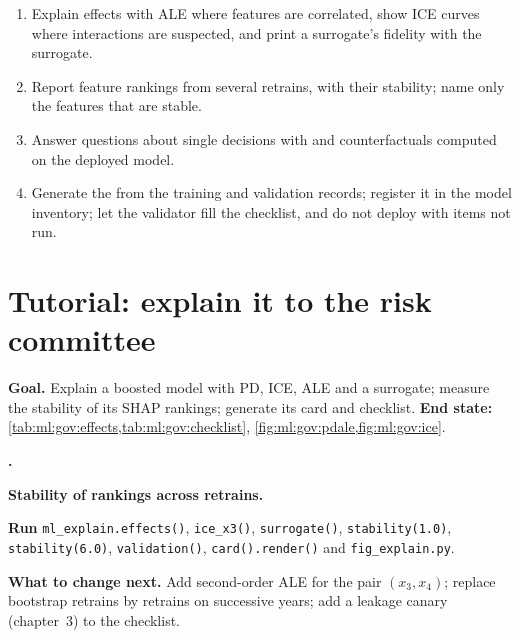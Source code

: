 \begin{method}\label{met:ml:gov:method}
\begin{enumerate}
\item Explain effects with ALE where features are correlated, show ICE curves where interactions are suspected, and print a
surrogate's fidelity with the surrogate.
\item Report feature rankings from several retrains, with their stability; name only the features that are stable.
\item Answer questions about single decisions with  and counterfactuals computed on the deployed model.
\item Generate the  from the training and validation records; register it in the model inventory; let the validator
fill the checklist, and do not deploy with items not run.
\end{enumerate}
\end{method}

\section{Tutorial: explain it to the risk committee}\label{tut:ml:interpretability-and-model-governance:tut}

\begin{tutorial}
\textbf{Goal.} Explain a boosted model with PD, ICE, ALE and a surrogate; measure the stability of its SHAP rankings; generate
its card and checklist. \textbf{End state:} \cref{tab:ml:gov:effects,tab:ml:gov:checklist},
\cref{fig:ml:gov:pdale,fig:ml:gov:ice}.
\begin{tutsteps}
\item \textbf{.}
\label{lst:ml:gov:ale}
\item \textbf{Stability of rankings across retrains.}
\label{lst:ml:gov:stab}
\item \textbf{Run} \texttt{ml\_explain.effects()}, \texttt{ice\_x3()}, \texttt{surrogate()}, \texttt{stability(1.0)},
\texttt{stability(6.0)}, \texttt{validation()}, \texttt{card().render()} and \texttt{fig\_explain.py}.
\end{tutsteps}
\textbf{What to change next.} Add second-order ALE for the pair $(x_3, x_4)$; replace bootstrap retrains by retrains on
successive years; add a leakage canary (chapter~3) to the checklist.
\end{tutorial}

